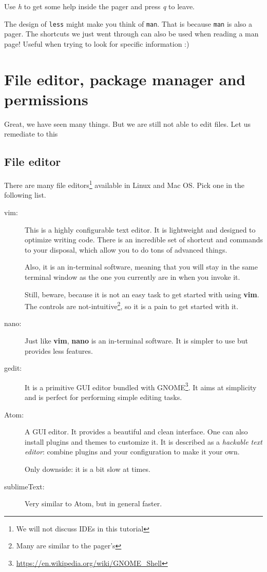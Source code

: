 \documentclass[12pt]{article}
\begin{document}
Use \textit{h} to get some help inside the pager and press {\textit{q}} to leave.

The design of \texttt{less} might make you think of \texttt{man}. That is because \texttt{man} is also a pager. The shortcuts we just went through can also be used when reading a man page! Useful when trying to look for specific information :)


\section{File editor, package manager and permissions}

Great, we have seen many things. But we are still not able to edit files. Let us remediate to this

\subsection{File editor}

There are many file editors\footnote{We will not discuss IDEs in this tutorial} available in Linux and Mac OS. Pick one in the following list.

\begin{description}
	\item[vim:] This is a highly configurable text editor. It is lightweight and designed to optimize writing code. There is an incredible set of shortcut and commands to your disposal, which allow you to do tons of advanced things.
	
	Also, it is an in-terminal software, meaning that you will stay in the same terminal window as the one you currently are in when you invoke it. 

	Still, beware, because it is not an easy task to get started with using \textbf{vim}. The controls are not-intuitive\footnote{Many are similar to the pager's}, so it is a pain to get started with it.
	\item[nano:] Just like \textbf{vim}, \textbf{nano} is an in-terminal software. It is simpler to use but provides less features.
	\item[gedit:] It is a primitive GUI editor bundled with GNOME\footnote{\url{https://en.wikipedia.org/wiki/GNOME_Shell}}. It aims at simplicity and is perfect for performing simple editing tasks.
	\item[Atom:] A GUI editor. It provides a beautiful and clean interface. One can also install plugins and themes to customize it. It is described as a \textit{hackable text editor}: combine plugins and your configuration to make it your own.
	
	Only downside: it is a bit slow at times.
	\item[sublimeText:] Very similar to Atom, but in general faster.
\end{description}
\end{document}
